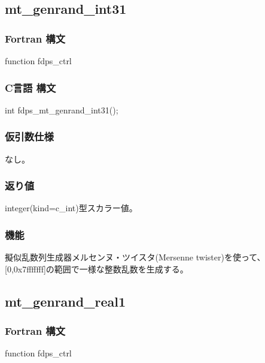 \subsection{mt\_genrand\_int31}
\subsubsection*{Fortran 構文}
\begin{screen}
\begin{spverbatim}
function fdps_ctrl%
\end{spverbatim}
\end{screen}

\subsubsection*{C言語 構文}
\begin{screen}
\begin{spverbatim}
int fdps_mt_genrand_int31();
\end{spverbatim}
\end{screen}

\subsubsection*{仮引数仕様}
なし。

\subsubsection*{返り値}
integer(kind=c\_int)型スカラー値。

\subsubsection*{機能}
擬似乱数列生成器メルセンヌ・ツイスタ(Mersenne twister)を使って、[0,0x7fffffff]の範囲で一様な整数乱数を生成する。
\clearpage

\subsection{mt\_genrand\_real1}
\subsubsection*{Fortran 構文}
\begin{screen}
\begin{spverbatim}
function fdps_ctrl%
\end{spverbatim}
\end{screen}

